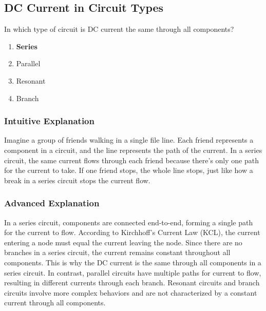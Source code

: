 \subsection{DC Current in Circuit Types}
\label{T5D13}

\begin{tcolorbox}[colback=gray!10!white,colframe=black!75!black,title=T5D13]
In which type of circuit is DC current the same through all components?
\begin{enumerate}[noitemsep]
    \item \textbf{Series}
    \item Parallel
    \item Resonant
    \item Branch
\end{enumerate}
\end{tcolorbox}

\subsubsection*{Intuitive Explanation}
Imagine a group of friends walking in a single file line. Each friend represents a component in a circuit, and the line represents the path of the current. In a series circuit, the same current flows through each friend because there's only one path for the current to take. If one friend stops, the whole line stops, just like how a break in a series circuit stops the current flow.

\subsubsection*{Advanced Explanation}
In a series circuit, components are connected end-to-end, forming a single path for the current to flow. According to Kirchhoff's Current Law (KCL), the current entering a node must equal the current leaving the node. Since there are no branches in a series circuit, the current remains constant throughout all components. This is why the DC current is the same through all components in a series circuit. In contrast, parallel circuits have multiple paths for current to flow, resulting in different currents through each branch. Resonant circuits and branch circuits involve more complex behaviors and are not characterized by a constant current through all components.